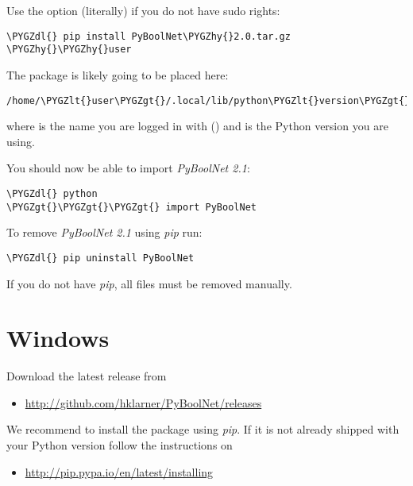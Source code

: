 \documentclass[letterpaper,10pt,english]{sphinxmanual}
\def\PYGZlt{\char`\<}
\def\PYGZgt{\char`\>}
\def\PYGZdl{\char`\$}
\def\PYGZhy{\char`\-}
\begin{document}
Use the option  (literally) if you do not have sudo rights:

\begin{Verbatim}[commandchars=\\\{\}]
\PYGZdl{} pip install PyBoolNet\PYGZhy{}2.0.tar.gz \PYGZhy{}\PYGZhy{}user
\end{Verbatim}

The package is likely going to be placed here:

\begin{Verbatim}[commandchars=\\\{\}]
/home/\PYGZlt{}user\PYGZgt{}/.local/lib/python\PYGZlt{}version\PYGZgt{}/dist\PYGZhy{}packages/PyBoolNet
\end{Verbatim}

where  is the name you are logged in with () and  is the Python version you are using.

You should now be able to import \emph{PyBoolNet 2.1}:

\begin{Verbatim}[commandchars=\\\{\}]
\PYGZdl{} python
\PYGZgt{}\PYGZgt{}\PYGZgt{} import PyBoolNet
\end{Verbatim}

To remove \emph{PyBoolNet 2.1} using \emph{pip} run:

\begin{Verbatim}[commandchars=\\\{\}]
\PYGZdl{} pip uninstall PyBoolNet
\end{Verbatim}

If you do not have \emph{pip}, all files must be removed manually.


\section{Windows}
\label{Installation:windows}
Download the latest release from
\begin{itemize}
\item {} 
\href{http://github.com/hklarner/PyBoolNet/releases}{http://github.com/hklarner/PyBoolNet/releases}

\end{itemize}

We recommend to install the package using \emph{pip}. If it is not already shipped with your Python version follow the instructions
on
\begin{itemize}
\item {} 
\href{http://pip.pypa.io/en/latest/installing}{http://pip.pypa.io/en/latest/installing}

\end{itemize}
\end{document}
